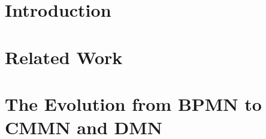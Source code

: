 
\addtolength{\evensidemargin}{-12mm}

%
%
\part[Introduction]{Introduction}
\label{part:introAndBackgroundTheory}


%

\part[Related Work]{Related Work}
\label{part:relatedWork}


\part[The Evolution from BPMN to CMMN and DMN]{The Evolution from BPMN to CMMN and DMN}
\label{part:background}


%
% 
%
% 
% 

% 
% 
% 


